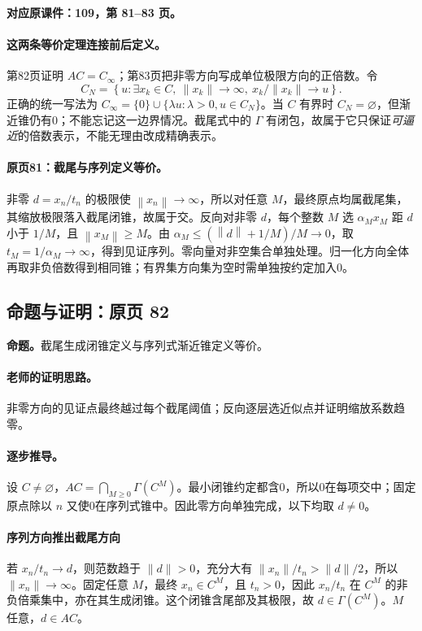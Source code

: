 \documentclass[11pt,a4paper]{article}
\newcommand{\norm}[1]{\left\lVert#1\right\rVert}
\theoremstyle{definition}\newtheorem{definition}{定义}\newtheorem{example}{例}
\begin{document}
\textbf{对应原课件：109，第 81--83 页。}


\paragraph{这两条等价定理连接前后定义。}
第82页证明 $AC=C_\infty$；第83页把非零方向写成单位极限方向的正倍数。令
\[C_N=\left\{u:\exists x_k\in C,\ \|x_k\|\to\infty,
\ x_k/\|x_k\|\to u\right\}.
\]
正确的统一写法为 $C_\infty=\{0\}\cup\{\lambda u:\lambda>0,u\in C_N\}$。当 $C$ 有界时 $C_N=\varnothing$，但渐近锥仍有0；不能忘记这一边界情况。截尾式中的 $\Gamma$ 有闭包，故属于它只保证\emph{可逼近}的倍数表示，不能无理由改成精确表示。


\paragraph{原页81：截尾与序列定义等价。}非零 $d=x_n/t_n$ 的极限使 $\norm{x_n}\to\infty$，所以对任意 $M$，最终原点均属截尾集，其缩放极限落入截尾闭锥，故属于交。反向对非零 $d$，每个整数 $M$ 选 $\alpha_M x_M$ 距 $d$ 小于 $1/M$，且 $\norm{x_M}\ge M$。由 $\alpha_M\le(\norm d+1/M)/M\to0$，取 $t_M=1/\alpha_M\to\infty$，得到见证序列。零向量对非空集合单独处理。归一化方向全体再取非负倍数得到相同锥；有界集方向集为空时需单独按约定加入0。



\subsection{命题与证明：原页 82}

\textbf{命题。}截尾生成闭锥定义与序列式渐近锥定义等价。

\paragraph{老师的证明思路。}非零方向的见证点最终越过每个截尾阈值；反向逐层选近似点并证明缩放系数趋零。

\paragraph{逐步推导。}
设 $C\ne\varnothing$，$AC=\bigcap_{M\ge0}\Gamma(C^M)$。最小闭锥约定都含0，所以0在每项交中；固定原点除以 $n$ 又使0在序列式锥中。因此零方向单独完成，以下均取 $d\ne0$。
\paragraph{序列方向推出截尾方向}
若 $x_n/t_n\to d$，则范数趋于 $\|d\|>0$，充分大有 $\|x_n\|/t_n>\|d\|/2$，所以 $\|x_n\|\to\infty$。固定任意 $M$，最终 $x_n\in C^M$，且 $t_n>0$，因此 $x_n/t_n$ 在 $C^M$ 的非负倍乘集中，亦在其生成闭锥。这个闭锥含尾部及其极限，故 $d\in\Gamma(C^M)$。$M$ 任意，$d\in AC$。
\end{document}
